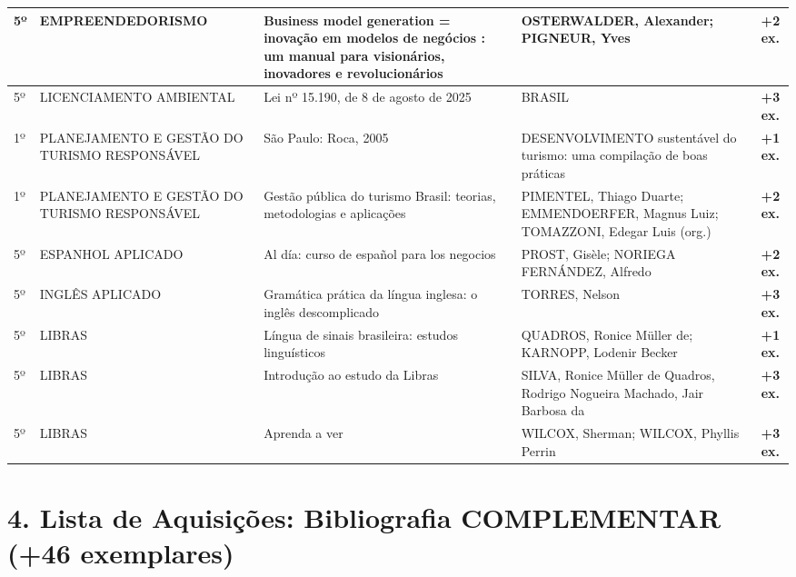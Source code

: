 \documentclass[11pt,a4paper]{article}
\begin{document}
\begin{longtable}{|p{1.2cm}|p{3.5cm}|p{6cm}|p{3.5cm}|c|}
5º & EMPREENDEDORISMO & Business model generation = inovação em modelos de negócios : um manual para visionários, inovadores e revolucionários & OSTERWALDER, Alexander; PIGNEUR, Yves & \textbf{+2 ex.} \\ \hline
5º & LICENCIAMENTO AMBIENTAL & Lei nº 15.190, de 8 de agosto de 2025 & BRASIL & \textbf{+3 ex.} \\ \hline
1º & PLANEJAMENTO E GESTÃO DO TURISMO RESPONSÁVEL & São Paulo: Roca, 2005 & DESENVOLVIMENTO sustentável do turismo: uma compilação de boas práticas & \textbf{+1 ex.} \\ \hline
1º & PLANEJAMENTO E GESTÃO DO TURISMO RESPONSÁVEL & Gestão pública do turismo Brasil: teorias, metodologias e aplicações & PIMENTEL, Thiago Duarte; EMMENDOERFER, Magnus Luiz; TOMAZZONI, Edegar Luis (org.) & \textbf{+2 ex.} \\ \hline
5º & ESPANHOL APLICADO & Al día: curso de español para los negocios & PROST, Gisèle; NORIEGA FERNÁNDEZ, Alfredo & \textbf{+2 ex.} \\ \hline
5º & INGLÊS APLICADO & Gramática prática da língua inglesa: o inglês descomplicado & TORRES, Nelson & \textbf{+3 ex.} \\ \hline
5º & LIBRAS & Língua de sinais brasileira: estudos linguísticos & QUADROS, Ronice Müller de; KARNOPP, Lodenir Becker & \textbf{+1 ex.} \\ \hline
5º & LIBRAS & Introdução ao estudo da Libras & SILVA, Ronice Müller de Quadros, Rodrigo Nogueira Machado, Jair Barbosa da & \textbf{+3 ex.} \\ \hline
5º & LIBRAS & Aprenda a ver & WILCOX, Sherman; WILCOX, Phyllis Perrin & \textbf{+3 ex.} \\ \hline
\end{longtable}

\newpage
\section*{4. Lista de Aquisições: Bibliografia COMPLEMENTAR (+46 exemplares)}
\end{document}
